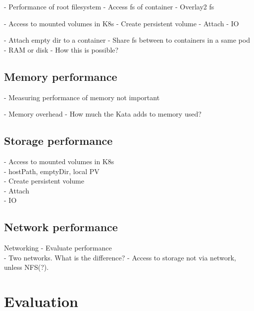 - Performance of root filesystem
	- Access fs of container
	- Overlay2 fs

- Access to mounted volumes in K8s
	- Create persistent volume
	- Attach
	- IO

- Attach empty dir to a container
	- Share fs between to containers in a same pod
	- RAM or disk
	- How this is possible?

\subsection{Memory performance}

- Measuring performance of memory not important

- Memory overhead
	- How much the Kata adds to memory used?

\subsection{Storage performance}

- Access to mounted volumes in K8s \\
    - hostPath, emptyDir, local PV \\
	- Create persistent volume \\
	- Attach \\
	- IO \\

\subsection{Network performance}

Networking
    - Evaluate performance \\
    - Two networks. What is the difference?
    - Access to storage not via network, unless NFS(?).

\section{Evaluation}